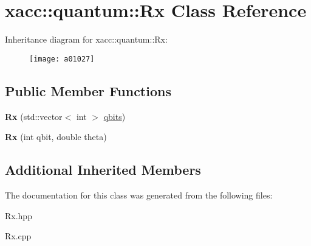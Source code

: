 \hypertarget{a01027}{}\section{xacc\+:\+:quantum\+:\+:Rx Class Reference}
\label{a01027}
Inheritance diagram for xacc\+:\+:quantum\+:\+:Rx\+:\begin{figure}[H]
\begin{center}
\leavevmode
\texttt{[image: a01027]}
\end{center}
\end{figure}
\subsection*{Public Member Functions}
\begin{DoxyCompactItemize}
\item 
\mbox{\label{a01027_a03babfe938a6cbf7f744fcd31a52d92d}} 
{\bfseries Rx} (std\+::vector$<$ int $>$ \hyperlink{a00991_a2a56be6c2519ea65df4d06f4abae1393}{qbits})
\item 
\mbox{\label{a01027_a01667b11d34d5621b98ebff9a07d9bbf}} 
{\bfseries Rx} (int qbit, double theta)
\end{DoxyCompactItemize}
\subsection*{Additional Inherited Members}


The documentation for this class was generated from the following files\+:\begin{DoxyCompactItemize}
\item 
Rx.\+hpp\item 
Rx.\+cpp\end{DoxyCompactItemize}
